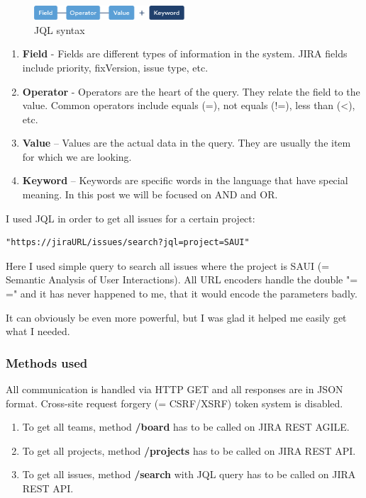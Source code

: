 \begin{figure}[!ht]
	\centering
	\includegraphics[width=0.5\textwidth]{figures/04_implementation/jql}
    \caption{JQL syntax}
\end{figure}

\begin{enumerate}
	\item {\bf Field} - Fields are different types of information in the system. JIRA fields include priority, fixVersion, issue type, etc.
	\item {\bf Operator} - Operators are the heart of the query. They relate the field to the value. Common operators include equals (=), not equals (!=), less than (<), etc.
	\item {\bf Value} – Values are the actual data in the query. They are usually the item for which we are looking.
	\item {\bf Keyword} – Keywords are specific words in the language that have special meaning. In this post we will be focused on AND and OR.
\end{enumerate}

I used JQL in order to get all issues for a certain project:

\begin{lstlisting}
"https://jiraURL/issues/search?jql=project=SAUI"
\end{lstlisting}

Here I used simple query to search all issues where the project is SAUI (= Semantic Analysis of User Interactions). All URL encoders handle the double "= =" and it has never happened to me, that it would encode the parameters badly.

It can obviously be even more powerful, but I was glad it helped me easily get what I needed.

\subsubsection{Methods used}

All communication is handled via HTTP GET and all responses are in JSON format. Cross-site request forgery (= CSRF/XSRF) token system is disabled.

\begin{enumerate}
	\item To get all teams, method {\bf /board} has to be called on JIRA REST AGILE.
	\item To get all projects, method {\bf /projects} has to be called on JIRA REST API.
	\item To get all issues, method {\bf /search} with JQL query has to be called on JIRA REST API.
\end{enumerate}

